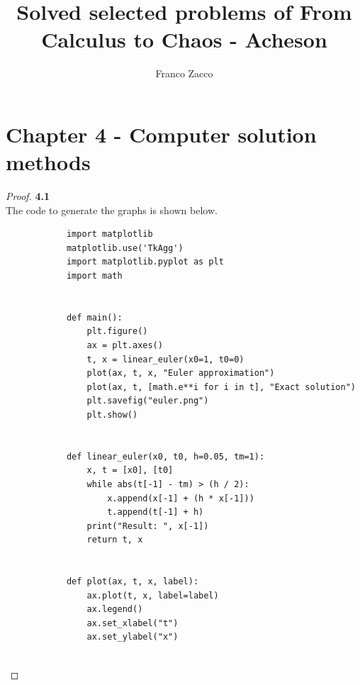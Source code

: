 \documentclass[11pt]{article}
\title{\textbf{Solved selected problems of From Calculus to Chaos - Acheson}}
\author{Franco Zacco}
\date{}
\begin{document}
\maketitle
\thispagestyle{empty}

\section*{Chapter 4 - Computer solution methods}

	\begin{proof}{\textbf{4.1}}\\
        The code to generate the graphs is shown below.
        \begin{verbatim}
            import matplotlib
            matplotlib.use('TkAgg')
            import matplotlib.pyplot as plt
            import math
            
            
            def main():
                plt.figure()
                ax = plt.axes()
                t, x = linear_euler(x0=1, t0=0)
                plot(ax, t, x, "Euler approximation")
                plot(ax, t, [math.e**i for i in t], "Exact solution")
                plt.savefig("euler.png")
                plt.show()
            
            
            def linear_euler(x0, t0, h=0.05, tm=1):
                x, t = [x0], [t0]
                while abs(t[-1] - tm) > (h / 2):
                    x.append(x[-1] + (h * x[-1]))
                    t.append(t[-1] + h)
                print("Result: ", x[-1])
                return t, x
            
            
            def plot(ax, t, x, label):
                ax.plot(t, x, label=label)
                ax.legend()
                ax.set_xlabel("t")
                ax.set_ylabel("x")
            

\end{verbatim}
\end{proof}
\end{document}
